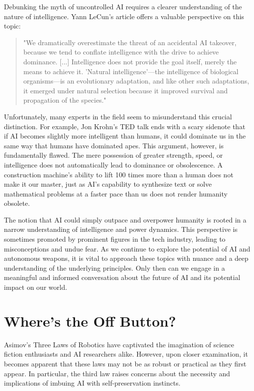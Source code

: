 Debunking the myth of uncontrolled AI requires a clearer understanding of the nature of intelligence. Yann LeCun's article \cite{dontfearterminator} offers a valuable perspective on this topic:

\begin{quote}
"We dramatically overestimate the threat of an accidental AI takeover, because we tend to conflate intelligence with the drive to achieve dominance. [...] Intelligence does not provide the goal itself, merely the means to achieve it. 'Natural intelligence'—the intelligence of biological organisms—is an evolutionary adaptation, and like other such adaptations, it emerged under natural selection because it improved survival and propagation of the species."
\end{quote}

Unfortunately, many experts in the field seem to misunderstand this crucial distinction. For example, Jon Krohn's TED talk ends with a scary sidenote that if AI becomes slightly more intelligent than humans, it could dominate us in the same way that humans have dominated apes. This argument, however, is fundamentally flawed. The mere possession of greater strength, speed, or intelligence does not automatically lead to dominance or obsolescence. A construction machine's ability to lift 100 times more than a human does not make it our master, just as AI's capability to synthesize text or solve mathematical problems at a faster pace than us does not render humanity obsolete.

The notion that AI could simply outpace and overpower humanity is rooted in a narrow understanding of intelligence and power dynamics. This perspective is sometimes promoted by prominent figures in the tech industry, leading to misconceptions and undue fear. As we continue to explore the potential of AI and autonomous weapons, it is vital to approach these topics with nuance and a deep understanding of the underlying principles. Only then can we engage in a meaningful and informed conversation about the future of AI and its potential impact on our world.


\section{Where's the Off Button?}

Asimov's Three Laws of Robotics have captivated the imagination of science fiction enthusiasts and AI researchers alike. However, upon closer examination, it becomes apparent that these laws may not be as robust or practical as they first appear. In particular, the third law raises concerns about the necessity and implications of imbuing AI with self-preservation instincts.


